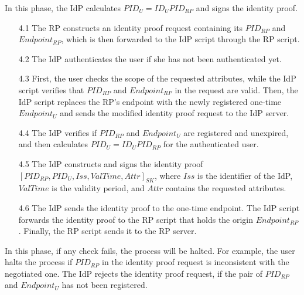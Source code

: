 In this phase, the IdP calculates $PID_U = {ID_U}{PID_{RP}}$ and signs the identity proof. %
\vspace{-\topsep}
\begin{itemize}
\item[4.1] The RP constructs an identity proof request containing its $PID_{RP}$ and $Endpoint_{RP}$, which is then forwarded to the IdP script through the RP script.
\vspace{-\topsep}
\item[4.2] The IdP authenticates the user if she has not been authenticated yet.
\vspace{-\topsep}
\item[4.3] First, the user checks the scope of the requested attributes, while the IdP script verifies that $PID_{RP}$ and $Endpoint_{RP}$ in the request are valid. Then, the IdP script replaces the RP's endpoint with the newly registered one-time $Endpoint_U$ and sends the modified identity proof request to the IdP server.
\vspace{-\topsep}
\item [4.4] The IdP verifies if $PID_{RP}$ and $Endpoint_U$ are registered and unexpired, and then calculates $PID_U = {ID_U}{PID_{RP}}$ for the authenticated user.
\vspace{-\topsep}
\item[4.5] The IdP constructs and signs the identity proof $[PID_{RP}, PID_U, Iss, ValTime, Attr]_{SK}$, where $Iss$ is the identifier of the IdP, $ValTime$ is the validity period, and $Attr$ contains the requested attributes.
\vspace{-\topsep}
\item[4.6] The IdP sends the identity proof to the one-time endpoint. The IdP script forwards the identity proof to the RP script that holds the origin $Endpoint_{RP}$. Finally, the RP script sends it to the RP server.
\end{itemize}
\vspace{-\topsep}
In this phase, if any check fails, the process will be halted. For example, the user halts the process if $PID_{RP}$ in the identity proof request is inconsistent with  the negotiated one. The IdP rejects the identity proof request, if the pair of $PID_{RP}$ and $Endpoint_U$ has not been registered.



